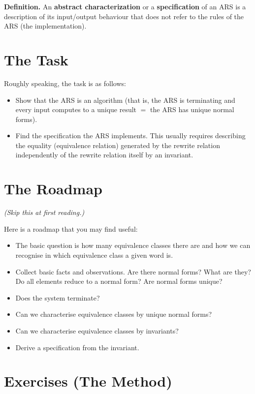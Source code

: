 \documentclass{article}
\theoremstyle{plain}
\theoremstyle{definition}
\theoremstyle{remark}
\begin{document}
\medskip

\textbf{Definition.} 
An \textbf{abstract characterization} or a \textbf{specification} of an ARS is a description of its input/output behaviour that does not refer to the rules of the ARS (the implementation). 

\section{The Task}

Roughly speaking, the task is as follows:

\begin{itemize}
    \item Show that the ARS is an algorithm (that is, the ARS is terminating and every input computes to a unique result $=$ the ARS has unique normal forms).
    \item Find the specification the ARS implements. This usually requires describing the equality (equivalence relation) generated by the rewrite relation independently of the rewrite relation itself by an invariant.
\end{itemize}

\section{The Roadmap}

\textit{(Skip this at first reading.)}

Here is a roadmap that you may find useful:

\begin{itemize}
    \item The basic question is how many equivalence classes there are and how we can recognise in which equivalence class a given word is.
    \item Collect basic facts and observations. Are there normal forms? What are they? Do all elements reduce to a normal form? Are normal forms unique?
    \item Does the system terminate?
    \item Can we characterise equivalence classes by unique normal forms?
    \item Can we characterise equivalence classes by invariants?
    \item Derive a specification from the invariant.
\end{itemize}

\section{Exercises (The Method)}
\end{document}
